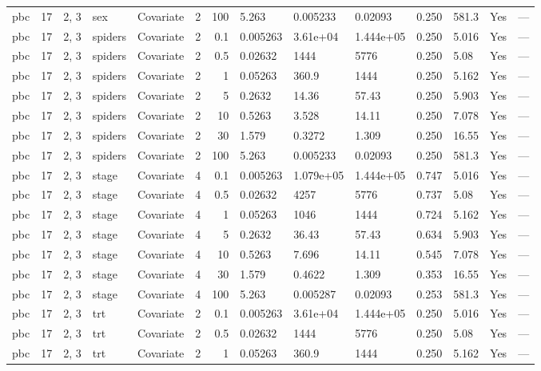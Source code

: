 \begin{tabular}{lrlllrrlllllll}
  pbc & 17 & 2, 3 & sex & Covariate & 2 &   100 & 5.263 & 0.005233 & 0.02093 & 0.250 & 581.3 & Yes & --- \\ 
  pbc & 17 & 2, 3 & spiders & Covariate & 2 &   0.1 & 0.005263 & 3.61e+04 & 1.444e+05 & 0.250 & 5.016 & Yes & --- \\ 
  pbc & 17 & 2, 3 & spiders & Covariate & 2 &   0.5 & 0.02632 & 1444 & 5776 & 0.250 & 5.08 & Yes & --- \\ 
  pbc & 17 & 2, 3 & spiders & Covariate & 2 &     1 & 0.05263 & 360.9 & 1444 & 0.250 & 5.162 & Yes & --- \\ 
  pbc & 17 & 2, 3 & spiders & Covariate & 2 &     5 & 0.2632 & 14.36 & 57.43 & 0.250 & 5.903 & Yes & --- \\ 
  pbc & 17 & 2, 3 & spiders & Covariate & 2 &    10 & 0.5263 & 3.528 & 14.11 & 0.250 & 7.078 & Yes & --- \\ 
  pbc & 17 & 2, 3 & spiders & Covariate & 2 &    30 & 1.579 & 0.3272 & 1.309 & 0.250 & 16.55 & Yes & --- \\ 
  pbc & 17 & 2, 3 & spiders & Covariate & 2 &   100 & 5.263 & 0.005233 & 0.02093 & 0.250 & 581.3 & Yes & --- \\ 
  pbc & 17 & 2, 3 & stage & Covariate & 4 &   0.1 & 0.005263 & 1.079e+05 & 1.444e+05 & 0.747 & 5.016 & Yes & --- \\ 
  pbc & 17 & 2, 3 & stage & Covariate & 4 &   0.5 & 0.02632 & 4257 & 5776 & 0.737 & 5.08 & Yes & --- \\ 
  pbc & 17 & 2, 3 & stage & Covariate & 4 &     1 & 0.05263 & 1046 & 1444 & 0.724 & 5.162 & Yes & --- \\ 
  pbc & 17 & 2, 3 & stage & Covariate & 4 &     5 & 0.2632 & 36.43 & 57.43 & 0.634 & 5.903 & Yes & --- \\ 
  pbc & 17 & 2, 3 & stage & Covariate & 4 &    10 & 0.5263 & 7.696 & 14.11 & 0.545 & 7.078 & Yes & --- \\ 
  pbc & 17 & 2, 3 & stage & Covariate & 4 &    30 & 1.579 & 0.4622 & 1.309 & 0.353 & 16.55 & Yes & --- \\ 
  pbc & 17 & 2, 3 & stage & Covariate & 4 &   100 & 5.263 & 0.005287 & 0.02093 & 0.253 & 581.3 & Yes & --- \\ 
  pbc & 17 & 2, 3 & trt & Covariate & 2 &   0.1 & 0.005263 & 3.61e+04 & 1.444e+05 & 0.250 & 5.016 & Yes & --- \\ 
  pbc & 17 & 2, 3 & trt & Covariate & 2 &   0.5 & 0.02632 & 1444 & 5776 & 0.250 & 5.08 & Yes & --- \\ 
  pbc & 17 & 2, 3 & trt & Covariate & 2 &     1 & 0.05263 & 360.9 & 1444 & 0.250 & 5.162 & Yes & --- \\ 

\end{tabular}
